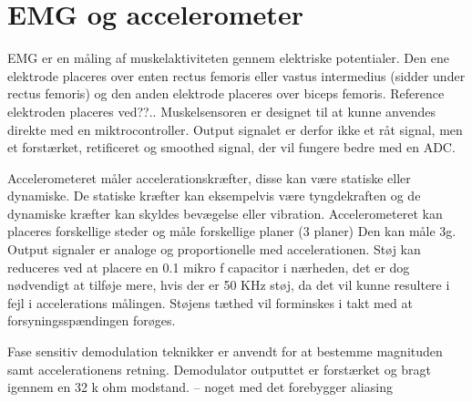 \section{EMG og accelerometer}

EMG er en måling af muskelaktiviteten gennem elektriske potentialer. Den ene elektrode placeres over enten rectus femoris eller vastus intermedius (sidder under rectus femoris) og den anden elektrode placeres over biceps femoris. Reference elektroden placeres ved??.. 
Muskelsensoren er designet til at kunne anvendes direkte med en miktrocontroller. Output signalet er derfor ikke et råt signal, men et forstærket, retificeret og smoothed signal, der vil fungere bedre med en ADC. 


Accelerometeret måler accelerationskræfter, disse kan være statiske eller dynamiske. De statiske kræfter kan eksempelvis være tyngdekraften og de dynamiske kræfter kan skyldes bevægelse eller vibration. Accelerometeret kan placeres forskellige steder og måle forskellige planer (3 planer) 
Den kan måle \pm 3g. Output signaler er analoge og proportionelle med accelerationen. Støj kan reduceres ved at placere en 0.1 mikro f capacitor i nærheden, det er dog nødvendigt at tilføje mere, hvis der er 50 KHz støj, da det vil kunne resultere i fejl i accelerations målingen. Støjens tæthed vil forminskes i takt med at forsyningsspændingen forøges. 


Fase sensitiv demodulation teknikker er anvendt for at bestemme magnituden samt accelerationens retning. Demodulator outputtet er forstærket og bragt igennem en 32 k ohm modstand. – noget med det forebygger aliasing 
